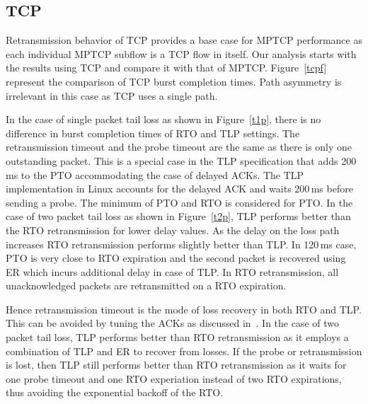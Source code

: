 \documentclass[10pt,conference,compsoc]{IEEEtran}
\begin{document}
\subsection{TCP}
Retransmission behavior of TCP provides a base case for MPTCP performance as each individual MPTCP subflow is a TCP flow in itself. Our analysis
starts with the results using TCP and compare it with that of MPTCP. Figure~\ref{tcpf} represent the comparison of TCP 
burst completion times. Path asymmetry is irrelevant in this case as TCP uses a single path.

In the case of single packet tail loss as shown in Figure~\ref{t1p}, there is no difference in burst completion times of RTO and TLP settings. The retransmission
timeout and the probe timeout are the same as there is only one outstanding packet. This is a special case in the TLP
specification that adds 200\,ms to the PTO accommodating the case of delayed ACKs. The TLP implementation in Linux accounts
for the delayed ACK and waits 200\,ms before sending a probe. The minimum of PTO and RTO is considered for PTO. In the case of two packet tail loss as shown in Figure~\ref{t2p},
TLP performs better than the RTO retransmission for lower delay values. As the delay on the loss path increases RTO retransmission performs slightly better than TLP. In 120\,ms case, PTO is very close to RTO expiration and the second packet is recovered using ER which incurs additional delay in case of TLP. In RTO retransmission, all unacknowledged packets are retransmitted on a RTO expiration. 

Hence retransmission timeout is the mode of loss recovery in both RTO and TLP. This can be avoided by tuning
the ACKs as discussed in~\cite{Rajiullah:2015}. In the case of two packet tail loss, TLP performs better than RTO retransmission as it employs a combination of TLP and ER to recover from losses. If the probe or retransmission is lost, then TLP still performs better than RTO retransmission as it waits for one probe timeout and one RTO experiation instead of two RTO expirations, thus avoiding the exponential backoff of the RTO.
\end{document}
